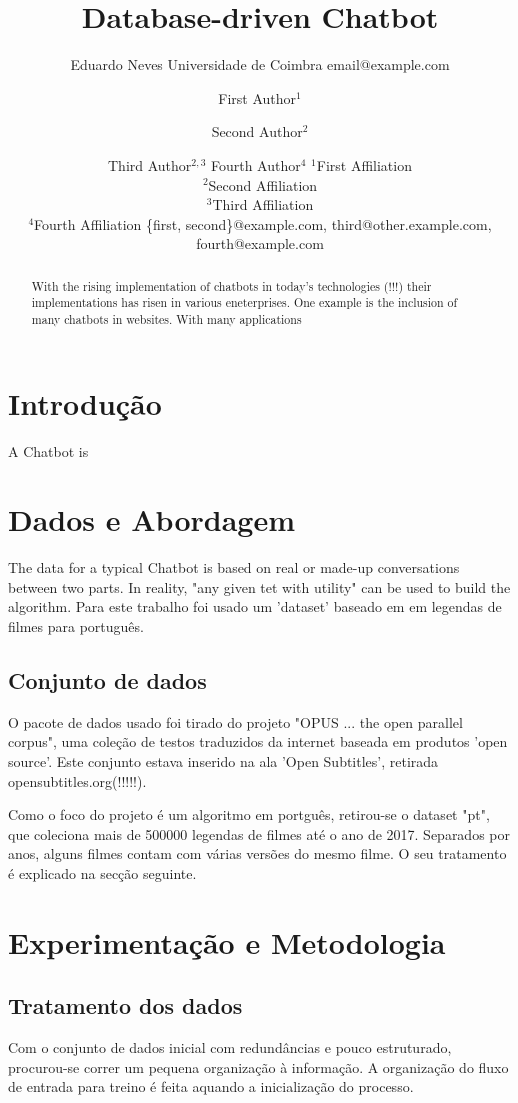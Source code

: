\documentclass{article}
\title{Database-driven Chatbot}
\author{
    Eduardo Neves
    \affiliations
    Universidade de Coimbra
    \emails
    email@example.com
}
\author{
First Author$^1$
\and
Second Author$^2$\and
Third Author$^{2,3}$\And
Fourth Author$^4$
\affiliations
$^1$First Affiliation\\
$^2$Second Affiliation\\
$^3$Third Affiliation\\
$^4$Fourth Affiliation
\emails
\{first, second\}@example.com,
third@other.example.com,
fourth@example.com
}
\begin{document}
\maketitle

\begin{abstract}
    With the rising implementation of chatbots in today's technologies
    (!!!) their implementations has risen in various eneterprises. One
    example is the inclusion of many chatbots in websites. With many 
    applications 
\end{abstract}

\section{Introdução}
A Chatbot is 


\section{Dados e Abordagem}
The data for a typical Chatbot is based on real or made-up conversations between two parts. In reality, "any given tet with utility" can be used to build the algorithm. Para este trabalho foi usado um 'dataset' baseado em em legendas de filmes para português.

\subsection{Conjunto de dados}
O pacote de dados usado foi tirado do projeto "OPUS ... the open parallel corpus", uma coleção de testos traduzidos da internet baseada em produtos 'open source'. Este conjunto estava inserido na ala 'Open Subtitles', retirada opensubtitles.org(!!!!!).

Como o foco do projeto é um algoritmo em portguês, retirou-se o dataset "pt", que coleciona mais de 500000 legendas de filmes até o ano de 2017. Separados por anos, alguns filmes contam com várias versões do mesmo filme. O seu tratamento é explicado na secção seguinte. 





\section{Experimentação e Metodologia}

\subsection{Tratamento dos dados}
Com o conjunto de dados inicial com redundâncias e pouco estruturado, procurou-se correr um pequena organização à informação. A organização do fluxo de entrada para treino é feita aquando a inicialização do processo.
\end{document}
